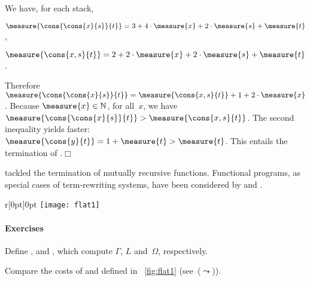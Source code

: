 We have, for each stack,
\begin{itemize*}

  \item \(\measure{\cons{\cons{x}{s}}{t}} = 3 + 4\cdot\measure{x} +
    2\cdot\measure{s} + \measure{t}\),

  \item \(\measure{\cons{x,s}{t}} = 2 + 2\cdot\measure{x} +
    2\cdot\measure{s} + \measure{t}\).

\end{itemize*}
Therefore \(\measure{\cons{\cons{x}{s}}{t}} = \measure{\cons{x,s}{t}}
+ 1 + 2\cdot\measure{x}\). Because \(\measure{x} \in \mathbb{N}\),
for all~\(x\), we have \(\measure{\cons{\cons{x}{s}}{t}} >
\measure{\cons{x,s}{t}}\). The second inequality yields faster:
\(\measure{\cons{y}{t}} = 1 + \measure{t} > \measure{t}\). This
entails the termination of
.\hfill\(\Box\)

\cite{Giesl_1997} tackled the termination of mutually recursive
functions. Functional programs, as special cases of
term\hyp{}rewriting systems, have been considered by
\cite{Giesl_1995b} and \cite{GieslWaltherBrauburger_1998}.

%
\begin{wrapfigure}[6]{r}[0pt]{0pt}
\centering
\texttt{[image: flat1]}%
\caption{Variant flattening}
\label{fig:flat1}
\end{wrapfigure}

\paragraph{Exercises}

\begin{enumerate*}

  \item Define ,  and , which
    compute \(\Gamma\), \(L\) and~\(\Omega\), respectively.

  \item Compare the costs of  and
      defined in
    \fig~\ref{fig:flat1} (see~(\(\leadsto\))).

\end{enumerate*}
